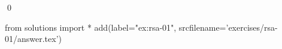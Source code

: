
\begin{ex} 
  \label{ex:rsa-01}
  
  \qed
\end{ex} 
\begin{python0}
from solutions import *
add(label="ex:rsa-01",
    srcfilename='exercises/rsa-01/answer.tex') 
\end{python0}
